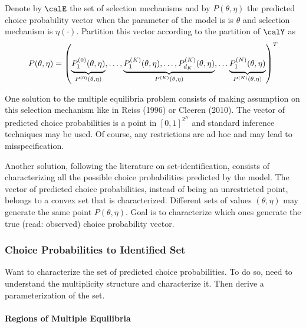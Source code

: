 Denote by $\calE$ the set of selection mechanisms and by \(P(\theta,\eta)\) the predicted choice probability vector when the parameter of the model is is \(\theta\) and selection mechanism is $\eta(\cdot)$. Partition this vector according to the partition of $\calY$ as 
\begin{equation}
	\label{eq:BK-2}
	P(\theta,\eta) = \left(\underbrace{\vphantom{,\dots P_{d_k}^{(K)}(\theta,\eta)}P_1^{(0)}(\theta,\eta)}_{P^{(0)}(\theta,\eta)},\dots, \underbrace{P_1^{(K)}(\theta,\eta),\dots, P_{d_K}^{(K)}(\theta,\eta)}_{P^{(K)}(\theta,\eta)},\dots\underbrace{\vphantom{,\dots P_{d_k}^{(K)}}P_1^{(N)}(\theta,\eta)}_{P^{(N)}(\theta,\eta)}\right)^T
\end{equation}

One solution to the multiple equilibria problem consists of making assumption on this selection mechanism like in Reiss (1996) or Cleeren (2010). The vector of predicted choice probabilities is a point in $[0,1]^{2^N}$ and standard inference techniques may be used. Of course, any restrictions are ad hoc and may lead to misspecification. 

Another solution, following the literature on set-identification, consists of characterizing all the possible choice probabilities predicted by the model. The vector of predicted choice probabilities, instead of being an unrestricted point, belongs to a convex set that is characterized. Different sets of values $(\theta, \eta)$ may generate the same point $P(\theta,\eta)$. Goal is to characterize which ones generate the true (read: observed) choice probability vector. 

\subsubsection{Choice Probabilities to Identified Set}

Want to characterize the set of predicted choice probabilities. To do so, need to understand the multiplicity structure and characterize it. Then derive a parameterization of the set. 

\paragraph{Regions of Multiple Equilibria}

